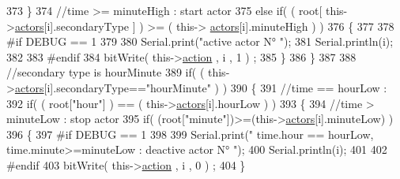 \begin{DoxyCode}
373                             \}
374                             \textcolor{comment}{//time >= minuteHigh : start actor}
375                             \textcolor{keywordflow}{else} \textcolor{keywordflow}{if}( ( root[ this->\hyperlink{class_jetpack_a7e16d2f97837f9712a2e6de1c50d99db}{actors}[i].secondaryType ] ) >= ( this->
      \hyperlink{class_jetpack_a7e16d2f97837f9712a2e6de1c50d99db}{actors}[i].minuteHigh ) )
376                             \{
377                         
378 \textcolor{preprocessor}{                            #if DEBUG == 1 }
379                         
380                                 Serial.print(\textcolor{stringliteral}{"active actor N° "});
381                                 Serial.println(i);
382                         
383 \textcolor{preprocessor}{                            #endif}
384                                 bitWrite( this->\hyperlink{class_jetpack_aca3142925a7b0834b34ae91d26af7765}{action} , i , 1 ) ;                    
385                             \}
386                         \}
387 
388                         \textcolor{comment}{//secondary type is hourMinute  }
389                         \textcolor{keywordflow}{if}( ( this->\hyperlink{class_jetpack_a7e16d2f97837f9712a2e6de1c50d99db}{actors}[i].secondaryType==\textcolor{stringliteral}{"hourMinute"} ) )
390                         \{
391                             \textcolor{comment}{//time == hourLow :}
392                             \textcolor{keywordflow}{if}( ( root[\textcolor{stringliteral}{"hour"}] ) == ( this->\hyperlink{class_jetpack_a7e16d2f97837f9712a2e6de1c50d99db}{actors}[i].hourLow ) )     
393                             \{
394                                 \textcolor{comment}{//time > minuteLow : stop actor}
395                                 \textcolor{keywordflow}{if}( (root[\textcolor{stringliteral}{"minute"}])>=(this->\hyperlink{class_jetpack_a7e16d2f97837f9712a2e6de1c50d99db}{actors}[i].minuteLow) )                       
396                                 \{
397 \textcolor{preprocessor}{                                #if DEBUG == 1 }
398                         
399                                     Serial.print(\textcolor{stringliteral}{" time.hour == hourLow, time.minute>=minuteLow : deactive
       actor N° "});
400                                     Serial.println(i);
401                     
402 \textcolor{preprocessor}{                                #endif  }
403                                     bitWrite( this->\hyperlink{class_jetpack_aca3142925a7b0834b34ae91d26af7765}{action} , i , 0 ) ;
404                                 \}   

\end{DoxyCode}

